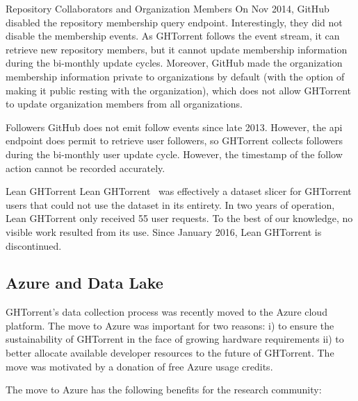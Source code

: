 \documentclass{sig-alternate}
\begin{document}
\begin{compactdesc}

  \item[Repository Collaborators and Organization Members] On Nov 2014, GitHub
    disabled the repository membership query endpoint. Interestingly, they did
    not disable the membership events. As GHTorrent follows the event stream, it
    can retrieve new repository members, but it cannot update membership
    information during the bi-monthly update cycles. Moreover, GitHub made the
    organization membership information private to organizations by default
    (with the option of making it public resting with the organization), which
    does not allow GHTorrent to update organization members from all
    organizations.

  \item[Followers] GitHub does not emit follow events since late 2013. However,
    the {\sc api} endpoint does permit to retrieve user followers, so GHTorrent
    collects followers during the bi-monthly user update cycle. However, the
    timestamp of the follow action cannot be recorded accurately.

  \item[Lean GHTorrent] Lean GHTorrent~\cite{GVSZ14} was effectively a dataset
    slicer for GHTorrent users that could not use the dataset in its
    entirety. In two years of operation, Lean GHTorrent only received 55 user
    requests. To the best of our knowledge, no visible work resulted from its
    use. Since January 2016, Lean GHTorrent is discontinued.

\end{compactdesc}

\subsection{Azure and Data Lake}
GHTorrent's data collection process was recently moved to the Azure cloud
platform. The move to Azure was important for two reasons: i) to ensure the
sustainability of GHTorrent in the face of growing hardware requirements ii) to
better allocate available developer resources to the future of GHTorrent. The
move was motivated by a donation of free Azure usage credits.

The move to Azure has the following benefits for the research community:
\end{document}
